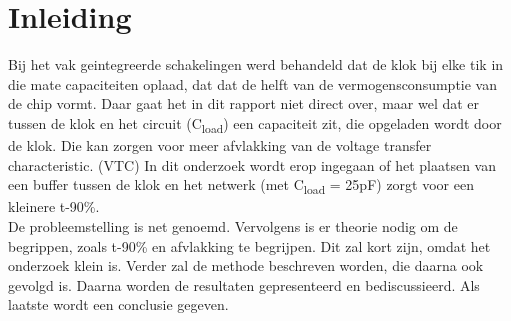\documentclass{report}
\begin{document}
\newcommand{\rp}{$\rightarrow$}
\newcommand{\Ohm}{$\Omega$}
\newcommand{\ohm}{$\omega$}
\newcommand{\gmu}{$\mu$}
\newcommand{\tss}{\textsubscript}
\newcommand{\lijst}{}


\tableofcontents
\chapter{Inleiding}
Bij het vak geintegreerde schakelingen werd behandeld dat de klok bij elke tik in die mate capaciteiten oplaad, dat dat de helft van de vermogensconsumptie van de chip vormt. Daar gaat het in dit rapport niet direct over, maar wel dat er tussen de klok en het circuit (C\tss{load}) een capaciteit zit, die opgeladen wordt door de klok. Die kan zorgen voor meer afvlakking van de voltage transfer characteristic. (VTC) In dit onderzoek wordt erop ingegaan of het plaatsen van een buffer tussen de klok en het netwerk (met C\tss{load} = 25pF) zorgt voor een kleinere t-90\%. \newline \\
De probleemstelling is net genoemd. Vervolgens is er theorie nodig om de begrippen, zoals t-90\% en afvlakking te begrijpen. Dit zal kort zijn, omdat het onderzoek klein is. Verder zal de methode beschreven worden, die daarna ook gevolgd is. Daarna worden de resultaten gepresenteerd en bediscussieerd. Als laatste wordt een conclusie gegeven. 
\end{document}
